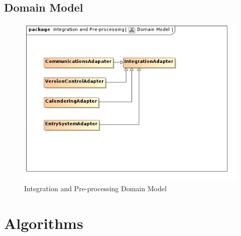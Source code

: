 \documentclass[11pt,a4paper]{article}
\begin{document}
\subsection{Domain Model}
\begin{figure}[H]
	\begin{center}
		\includegraphics[scale=0.75]{../Images/Integration Domain Model.jpg}
		\caption{Integration and Pre-processing Domain Model}
	\end{center}
\end{figure}

\pagebreak

\section{Algorithms}
\end{document}

